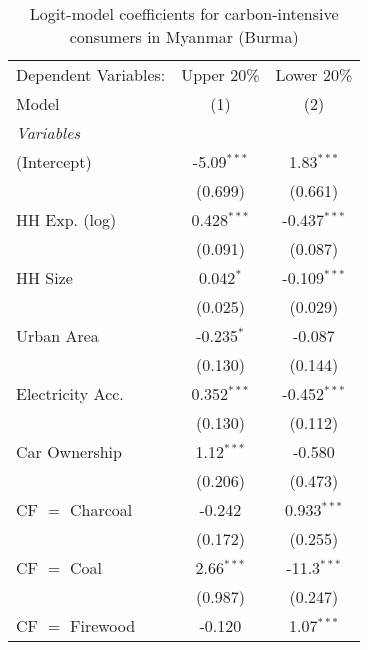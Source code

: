 
\begin{table}[htbp!]
   \centering
   \small
   \begin{adjustbox}{width = 1\textwidth, max height = 0.95\textheight, center}
      \begin{threeparttable}[b]
         \caption{\label{tab:Logit_1_MMR} Logit-model coefficients for carbon-intensive consumers in Myanmar (Burma)}
         \begin{tabular}{lcc}
            \tabularnewline \midrule \midrule
            Dependent Variables: & Upper 20\%    & Lower 20\%\\   
            Model                & (1)           & (2)\\  
            \midrule
            \emph{Variables}\\
            (Intercept)          & -5.09$^{***}$ & 1.83$^{***}$\\   
                                 & (0.699)       & (0.661)\\   
            HH Exp. (log)        & 0.428$^{***}$ & -0.437$^{***}$\\   
                                 & (0.091)       & (0.087)\\   
            HH Size              & 0.042$^{*}$   & -0.109$^{***}$\\   
                                 & (0.025)       & (0.029)\\   
            Urban Area           & -0.235$^{*}$  & -0.087\\   
                                 & (0.130)       & (0.144)\\   
            Electricity Acc.     & 0.352$^{***}$ & -0.452$^{***}$\\   
                                 & (0.130)       & (0.112)\\   
            Car Ownership        & 1.12$^{***}$  & -0.580\\   
                                 & (0.206)       & (0.473)\\   
            CF $=$ Charcoal      & -0.242        & 0.933$^{***}$\\   
                                 & (0.172)       & (0.255)\\   
            CF $=$ Coal          & 2.66$^{***}$  & -11.3$^{***}$\\   
                                 & (0.987)       & (0.247)\\   
            CF $=$ Firewood      & -0.120        & 1.07$^{***}$\\   

\end{tabular}
\end{threeparttable}
\end{adjustbox}
\end{table}
